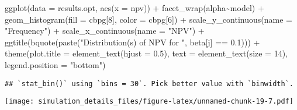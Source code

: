 \documentclass[
]{article}
\newenvironment{Shaded}{\begin{snugshade}}{\end{snugshade}}
\newcommand{\AttributeTok}[1]{\textcolor[rgb]{0.77,0.63,0.00}{#1}}
\newcommand{\DecValTok}[1]{\textcolor[rgb]{0.00,0.00,0.81}{#1}}
\newcommand{\FloatTok}[1]{\textcolor[rgb]{0.00,0.00,0.81}{#1}}
\newcommand{\FunctionTok}[1]{\textcolor[rgb]{0.00,0.00,0.00}{#1}}
\newcommand{\NormalTok}[1]{#1}
\newcommand{\SpecialCharTok}[1]{\textcolor[rgb]{0.00,0.00,0.00}{#1}}
\newcommand{\StringTok}[1]{\textcolor[rgb]{0.31,0.60,0.02}{#1}}
\begin{document}
\begin{Shaded}
\begin{Highlighting}[]
\FunctionTok{ggplot}\NormalTok{(}\AttributeTok{data =}\NormalTok{ results.opt,}
       \FunctionTok{aes}\NormalTok{(}\AttributeTok{x =}\NormalTok{ npv)) }\SpecialCharTok{+}
  \FunctionTok{facet\_wrap}\NormalTok{(alpha}\SpecialCharTok{\textasciitilde{}}\NormalTok{model) }\SpecialCharTok{+}
  \FunctionTok{geom\_histogram}\NormalTok{(}\AttributeTok{fill =}\NormalTok{ cbpg[}\DecValTok{8}\NormalTok{], }\AttributeTok{color =}\NormalTok{ cbpg[}\DecValTok{6}\NormalTok{]) }\SpecialCharTok{+}
  \FunctionTok{scale\_y\_continuous}\NormalTok{(}\AttributeTok{name =} \StringTok{"Frequency"}\NormalTok{) }\SpecialCharTok{+}
  \FunctionTok{scale\_x\_continuous}\NormalTok{(}\AttributeTok{name =} \StringTok{"NPV"}\NormalTok{) }\SpecialCharTok{+}
  \FunctionTok{ggtitle}\NormalTok{(}\FunctionTok{bquote}\NormalTok{(}\FunctionTok{paste}\NormalTok{(}\StringTok{"Distribution(s) of NPV for "}\NormalTok{, beta[j] }\SpecialCharTok{==} \FloatTok{0.1}\NormalTok{))) }\SpecialCharTok{+}
  \FunctionTok{theme}\NormalTok{(}\AttributeTok{plot.title =} \FunctionTok{element\_text}\NormalTok{(}\AttributeTok{hjust =} \FloatTok{0.5}\NormalTok{), }
        \AttributeTok{text =} \FunctionTok{element\_text}\NormalTok{(}\AttributeTok{size =} \DecValTok{14}\NormalTok{),}
        \AttributeTok{legend.position =} \StringTok{"bottom"}\NormalTok{)}
\end{Highlighting}
\end{Shaded}

\begin{verbatim}
## `stat_bin()` using `bins = 30`. Pick better value with `binwidth`.
\end{verbatim}

\texttt{[image: simulation\_details\_files/figure-latex/unnamed-chunk-19-7.pdf]}
\end{document}
